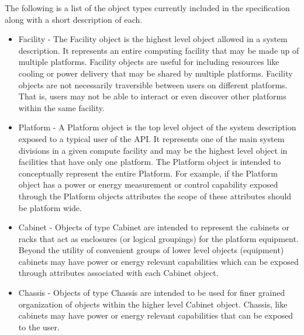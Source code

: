 
The following is a list of the object types currently included in the specification along with a short description of each.
\begin{itemize}[noitemsep,nolistsep] %
	\item{
Facility - The Facility object is the highest level object allowed in a system description. 
It represents an entire computing facility that may be made up of multiple platforms.
Facility objects are useful for including resources like cooling or power delivery that may be shared by multiple platforms.
Facility objects are not necessarily traversible between users on different platforms. 
That is, users may not be able to interact or even discover other platforms within the same facility.
} 
        \item{
Platform - A Platform object is the top level object of the system description exposed to a typical user of the API.
It represents one of the main system divisions in a given compute facility and may be the highest level object in facilities that have only one platform. 
The Platform object is intended to conceptually represent the entire Platform.
For example, if the Platform object has a power or energy measurement or control capability exposed through the Platform objects attributes the scope of these attributes should be platform wide.
}
	\item{
Cabinet - Objects of type Cabinet are intended to represent the cabinets or racks that act as enclosures (or logical groupings) for the platform equipment. 
Beyond the utility of convenient groups of lower level objects (equipment) cabinets may have power or energy relevant capabilities which can be exposed through attributes associated with each Cabinet object. 
}
	\item{
Chassis - Objects of type Chassis are intended to be used for finer grained organization of objects within the higher level Cabinet object. Chassis, like cabinets may have power or energy relevant capabilities that can be exposed to the user.
}
\end{itemize}
